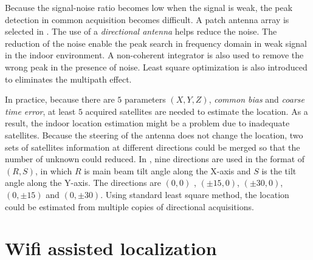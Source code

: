 \documentclass[letterpaper]{article}
\begin{document}
Because the signal-noise ratio becomes low when the signal is weak, the peak detection in common acquisition becomes difficult.
A patch antenna array is selected in \cite{Nirjon:2014:CIL:2594368.2594378}.
The use of a \emph{directional antenna} helps reduce the noise.
The reduction of the noise enable the peak search in frequency domain in weak signal in the indoor environment.
A non-coherent integrator is also used to remove the wrong peak in the presence of noise.
Least square optimization is also introduced to eliminates the multipath effect.

In practice, because there are $ 5 $ parameters $ (X, Y, Z) $, \emph{common bias} and \emph{coarse time error}, at least $ 5 $ acquired satellites are needed to estimate the location.
As a result, the indoor location estimation might be a problem due to inadequate satellites.
Because the steering of the antenna does not change the location, two sets of satellites information at different directions could be merged so that the number of unknown could reduced.
In \cite{Nirjon:2014:CIL:2594368.2594378}, nine directions are used in the format of $ (R, S) $, in which $ R $ is main beam tilt angle along the X-axis and $ S $ is the tilt angle along the Y-axis.
The directions are $ (0, 0) $ , $ (\pm 15, 0) $, $ (\pm 30, 0) $, $ (0, \pm 15) $ and $ (0, \pm 30) $.
Using standard least square method, the location could be estimated from multiple copies of directional acquisitions.

\section{Wifi assisted localization}
\end{document}
